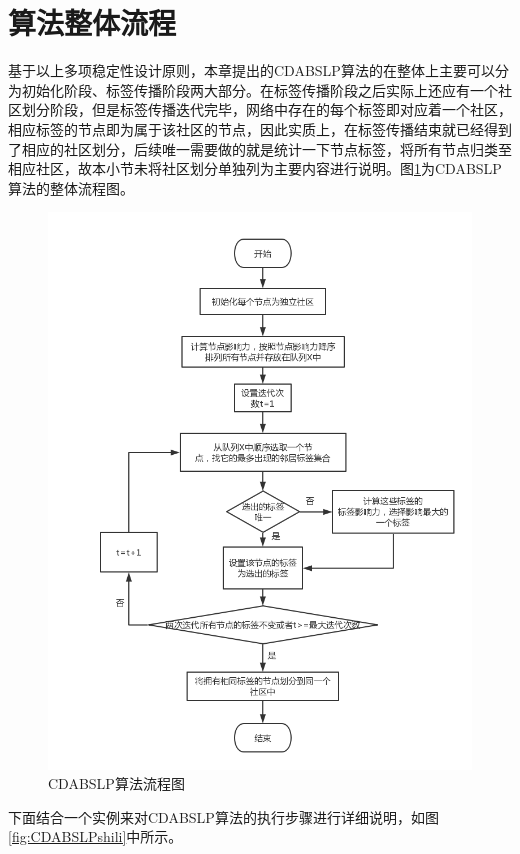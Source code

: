 \section{算法整体流程}

基于以上多项稳定性设计原则，本章提出的CDABSLP算法的在整体上主要可以分为初始化阶段、标签传播阶段两大部分。在标签传播阶段之后实际上还应有一个社区划分阶段，但是标签传播迭代完毕，网络中存在的每个标签即对应着一个社区，相应标签的节点即为属于该社区的节点，因此实质上，在标签传播结束就已经得到了相应的社区划分，后续唯一需要做的就是统计一下节点标签，将所有节点归类至相应社区，故本小节未将社区划分单独列为主要内容进行说明。图\ref{fig:cdabslp}为CDABSLP算法的整体流程图。

\begin{figure}
  \centering
  \includegraphics[width=1\textwidth]{figures/cdabslp}
  \caption{CDABSLP算法流程图}\label{fig:cdabslp}
 \end{figure}

下面结合一个实例来对CDABSLP算法的执行步骤进行详细说明，如图\ref{fig:CDABSLPshili}中所示。


